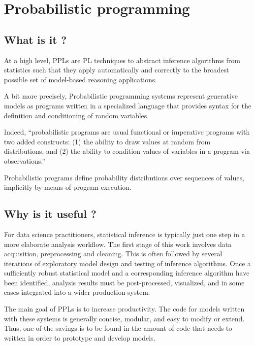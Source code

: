 
\chapter{Probabilistic programming}

\section{What is it ?} \label{PPL_def}
At a high level, \glspl{PPL} are \gls{PL} techniques to abstract inference algorithms from statistics such that they apply automatically and correctly to the broadest possible set of model-based reasoning applications.

A bit more precisely, Probabilistic programming systems \cite{Goodman:2012uq,dippl,Mansinghka:2014ty,wood-aistats-2014} represent generative models as programs written in a specialized language that provides syntax for the definition and conditioning of random variables.

Indeed, ``probabilistic programs are usual functional or imperative programs with two added constructs: 
(1) the ability to draw values at random from distributions, and 
(2) the ability to condition values of variables in a program via observations.'' \cite{Gordon:2014:PP:2593882.2593900}

Probabilistic programs define probability distributions over sequences of values, implicitly by means of program execution.

\section{Why is it useful ?}
For data science practitioners, statistical inference is typically just one step in a more elaborate analysis workflow. The first stage of this work involves data acquisition, preprocessing and cleaning. This is often followed by several iterations of exploratory model design and testing of inference algorithms. Once a sufficiently robust statistical model and a corresponding inference algorithm have been identified, analysis results must be post-processed, visualized, and in some cases integrated into a wider production system.

The main goal of \glspl{PPL} is to increase productivity. 
The code for models written with these systems is generally concise, modular, and easy to modify or extend.
Thus, one of the savings is to be found in the amount of code that needs to written in order to prototype and develop models.


